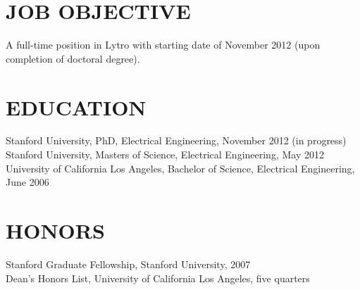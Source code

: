 \documentclass{res}
\begin{document}
 

\address{\texttt{jesselu@stanford.edu} \\ 66 Newell Rd. Apt. O \\ East Palo Alto, CA \\ (408) 568-9356}
                                  
\begin{resume}

\section{JOB OBJECTIVE}          
    A full-time position in Lytro with starting date of November 2012 
    (upon completion of doctoral degree).

\section{EDUCATION}          
    Stanford University, PhD, Electrical Engineering, November 2012 (in progress) \\
    Stanford University, Masters of Science, Electrical Engineering, May 2012 \\
    University of California Los Angeles, Bachelor of Science, Electrical Engineering, June 2006

\section{HONORS}
    Stanford Graduate Fellowship, Stanford University, 2007 \\
    Dean's Honors List, University of California Los Angeles, five quarters
 

\end{resume}
\end{document}
